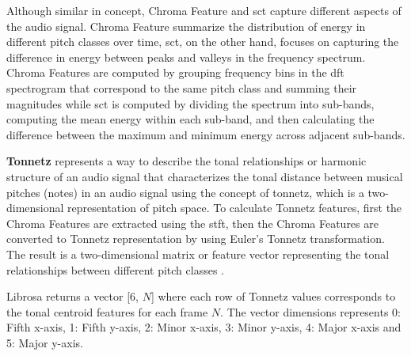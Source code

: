 


Although similar in concept, Chroma Feature and \gls{sct} capture different aspects of the audio signal. Chroma Feature summarize the distribution of energy in different pitch classes over time, \gls{sct}, on the other hand, focuses on capturing the difference in energy between peaks and valleys in the frequency spectrum. Chroma Features are computed by grouping frequency bins in the \gls{dft} spectrogram that correspond to the same pitch class and summing their magnitudes while \gls{sct} is computed by dividing the spectrum into sub-bands, computing the mean energy within each sub-band, and then calculating the difference between the maximum and minimum energy across adjacent sub-bands.


\textbf{Tonnetz} represents a way to describe the tonal relationships or harmonic structure of an audio signal that characterizes the tonal distance between musical pitches (notes) in an audio signal using the concept of tonnetz, which is a two-dimensional representation of pitch space. To calculate Tonnetz features, first the Chroma Features are extracted using the \gls{stft}, then the Chroma Features are converted to Tonnetz representation by using Euler's Tonnetz transformation. The result is a two-dimensional matrix or feature vector representing the tonal relationships between different pitch classes \cite{Harte2006}.

Librosa returns a vector  [6, $N$] where each row of Tonnetz values corresponds to the tonal centroid features for each frame $N$. The vector dimensions represents 0: Fifth x-axis, 1: Fifth y-axis, 2: Minor x-axis, 3: Minor y-axis, 4: Major x-axis and 5: Major y-axis.%

